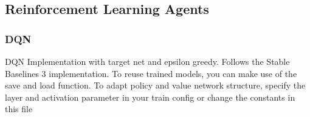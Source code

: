 \documentclass[letterpaper,10pt,english]{sphinxmanual}
\begin{document}
\subsection{Reinforcement Learning Agents}
\label{\detokenize{agents.reinforcement_learning:reinforcement-learning-agents}}\label{\detokenize{agents.reinforcement_learning::doc}}

\subsubsection{DQN}
\label{\detokenize{agents.reinforcement_learning:module-agents.reinforcement_learning.dqn}}\label{\detokenize{agents.reinforcement_learning:dqn}}
\sphinxAtStartPar
DQN Implementation with target net and epsilon greedy. Follows the Stable Baselines 3 implementation.
To reuse trained models, you can make use of the save and load function.
To adapt policy and value network structure, specify the layer and activation parameter in your train config or
change the constants in this file
\end{document}
